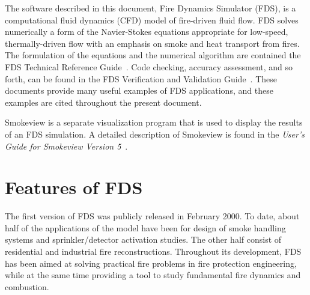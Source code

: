 \documentclass[11pt]{book}
\begin{document}
The software described in this document, Fire Dynamics Simulator (FDS), is a computational
fluid dynamics (CFD) model of fire-driven fluid flow. FDS solves numerically a form of the
Navier-Stokes equations appropriate for low-speed, thermally-driven flow
with an emphasis on smoke and heat transport from fires.
The formulation of the equations and the numerical algorithm are contained the FDS Technical Reference Guide~\cite{FDS_Tech_Guide_5}.
Code checking, accuracy assessment, and so forth, can be found in the FDS Verification and Validation Guide~\cite{FDS_VV_Guide_5}.
These documents provide many useful examples of FDS applications, and these examples are cited
throughout the present document.

Smokeview is a separate visualization program that is used to display the
results of an FDS simulation.
A detailed description of Smokeview is found in the
{\em User's Guide for Smokeview Version 5}~\cite{Smokeview_Users_Guide_5}.


\section{Features of FDS}

The first version of FDS was publicly released in February 2000.
To date, about half of the applications of the model have been for design of smoke
handling systems and sprinkler/detector activation studies. The other half consist of
residential and industrial fire reconstructions. Throughout its development, FDS has
been aimed at solving practical fire problems in fire protection engineering, while
at the same time providing a tool to study fundamental fire dynamics and combustion.
\end{document}
